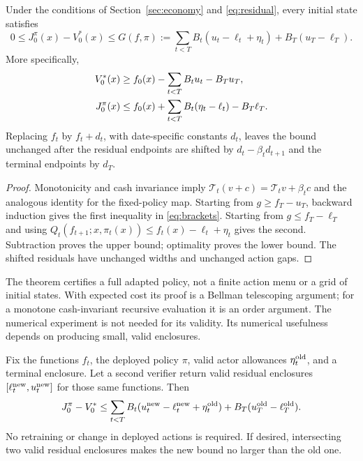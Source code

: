 \documentclass[ecta,nameyear,draft]{econsocart}
\begin{document}
\begin{theorem}\label{thm:policy}
Under the conditions of Section~\ref{sec:economy} and \eqref{eq:residual}, every initial state satisfies
\begin{equation}\label{eq:gap}
 0\leq J^\pi_0(x)-V_0^*(x)\leq
 G(f,\pi):=\sum_{t<T}B_t(u_t-\ell_t+\eta_t)+B_T(u_T-\ell_T).
\end{equation}
More specifically,
\begin{align}\label{eq:brackets}
 V_0^*(x)&\geq f_0(x)-\sum_{t<T}B_tu_t-B_Tu_T,\\
 J_0^\pi(x)&\leq f_0(x)+\sum_{t<T}B_t(\eta_t-\ell_t)-B_T\ell_T.\notag
\end{align}
Replacing $f_t$ by $f_t+d_t$, with date-specific constants $d_t$, leaves the bound unchanged after the residual endpoints are shifted by $d_t-\beta_td_{t+1}$ and the terminal endpoints by $d_T$.
\end{theorem}

\begin{proof}
Monotonicity and cash invariance imply
$\mathcal T_t(v+c)=\mathcal T_tv+\beta_tc$ and the analogous identity for the fixed-policy map. Starting from $g\geq f_T-u_T$, backward induction gives the first inequality in \eqref{eq:brackets}. Starting from $g\leq f_T-\ell_T$ and using
$Q_t(f_{t+1};x,\pi_t(x))\leq f_t(x)-\ell_t+\eta_t$
gives the second. Subtraction proves the upper bound; optimality proves the lower bound. The shifted residuals have unchanged widths and unchanged action gaps.
\end{proof}

The theorem certifies a full adapted policy, not a finite action menu or a grid of initial states. With expected cost its proof is a Bellman telescoping argument; for a monotone cash-invariant recursive evaluation it is an order argument. The numerical experiment is not needed for its validity. Its numerical usefulness depends on producing small, valid enclosures.

\begin{corollary}\label{cor:retain}
Fix the functions $f_t$, the deployed policy $\pi$, valid actor allowances $\eta_t^{\rm old}$, and a terminal enclosure. Let a second verifier return valid residual enclosures $[\ell_t^{\rm new},u_t^{\rm new}]$ for those same functions. Then
\begin{equation}\label{eq:retained}
 J_0^\pi-V_0^*\leq
 \sum_{t<T}B_t(u_t^{\rm new}-\ell_t^{\rm new}+\eta_t^{\rm old})
          +B_T(u_T^{\rm old}-\ell_T^{\rm old}).
\end{equation}
No retraining or change in deployed actions is required. If desired, intersecting two valid residual enclosures makes the new bound no larger than the old one.
\end{corollary}
\end{document}
